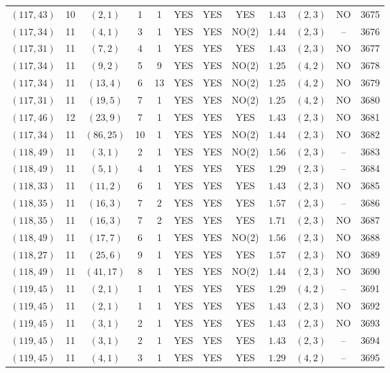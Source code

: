 \begin{longtable}{|c|c|c|c|c|c|c|c|c|c|c|c|}
$(117,43)$ & 10 & $(2,1)$ & 1 & 1 & YES & YES & YES & $1.43$ & $(2,3)$ & NO & 3675\\
$(117,34)$ & 11 & $(4,1)$ & 3 & 1 & YES & YES & NO(2) & $1.44$ & $(2,3)$ & -- & 3676\\
$(117,31)$ & 11 & $(7,2)$ & 4 & 1 & YES & YES & YES & $1.43$ & $(2,3)$ & NO & 3677\\
$(117,34)$ & 11 & $(9,2)$ & 5 & 9 & YES & YES & NO(2) & $1.25$ & $(4,2)$ & NO & 3678\\
$(117,34)$ & 11 & $(13,4)$ & 6 & 13 & YES & YES & NO(2) & $1.25$ & $(4,2)$ & NO & 3679\\
$(117,31)$ & 11 & $(19,5)$ & 7 & 1 & YES & YES & NO(2) & $1.25$ & $(4,2)$ & NO & 3680\\
$(117,46)$ & 12 & $(23,9)$ & 7 & 1 & YES & YES & YES & $1.43$ & $(2,3)$ & NO & 3681\\
$(117,34)$ & 11 & $(86,25)$ & 10 & 1 & YES & YES & NO(2) & $1.44$ & $(2,3)$ & NO & 3682\\
$(118,49)$ & 11 & $(3,1)$ & 2 & 1 & YES & YES & NO(2) & $1.56$ & $(2,3)$ & -- & 3683\\
$(118,49)$ & 11 & $(5,1)$ & 4 & 1 & YES & YES & YES & $1.29$ & $(2,3)$ & -- & 3684\\
$(118,33)$ & 11 & $(11,2)$ & 6 & 1 & YES & YES & YES & $1.43$ & $(2,3)$ & NO & 3685\\
$(118,35)$ & 11 & $(16,3)$ & 7 & 2 & YES & YES & YES & $1.57$ & $(2,3)$ & -- & 3686\\
$(118,35)$ & 11 & $(16,3)$ & 7 & 2 & YES & YES & YES & $1.71$ & $(2,3)$ & NO & 3687\\
$(118,49)$ & 11 & $(17,7)$ & 6 & 1 & YES & YES & NO(2) & $1.56$ & $(2,3)$ & NO & 3688\\
$(118,27)$ & 11 & $(25,6)$ & 9 & 1 & YES & YES & YES & $1.57$ & $(2,3)$ & NO & 3689\\
$(118,49)$ & 11 & $(41,17)$ & 8 & 1 & YES & YES & NO(2) & $1.44$ & $(2,3)$ & NO & 3690\\
$(119,45)$ & 11 & $(2,1)$ & 1 & 1 & YES & YES & YES & $1.29$ & $(4,2)$ & -- & 3691\\
$(119,45)$ & 11 & $(2,1)$ & 1 & 1 & YES & YES & YES & $1.43$ & $(2,3)$ & NO & 3692\\
$(119,45)$ & 11 & $(3,1)$ & 2 & 1 & YES & YES & YES & $1.43$ & $(2,3)$ & NO & 3693\\
$(119,45)$ & 11 & $(3,1)$ & 2 & 1 & YES & YES & YES & $1.43$ & $(2,3)$ & -- & 3694\\
$(119,45)$ & 11 & $(4,1)$ & 3 & 1 & YES & YES & YES & $1.29$ & $(4,2)$ & -- & 3695\\

\end{longtable}
